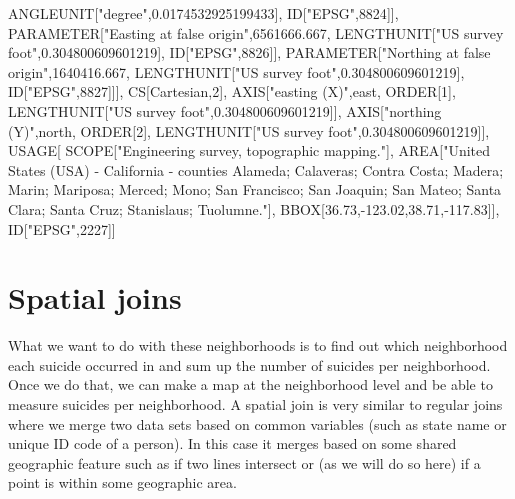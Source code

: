 \documentclass[
]{krantz}
\makeatletter
\newenvironment{Shaded}{\begin{snugshade}}{\end{snugshade}}
\newcommand{\DecValTok}[1]{\textcolor[rgb]{0.06,0.06,0.06}{#1}}
\newcommand{\FloatTok}[1]{\textcolor[rgb]{0.06,0.06,0.06}{#1}}
\newcommand{\NormalTok}[1]{#1}
\newcommand{\SpecialCharTok}[1]{\textcolor[rgb]{0,0,0}{#1}}
\newcommand{\StringTok}[1]{\textcolor[rgb]{0.5,0.5,0.5}{#1}}
\newenvironment{kframe}{%
\medskip{}
\setlength{\fboxsep}{.8em}
 \def\at@end@of@kframe{}%
 \ifinner\ifhmode%
  \def\at@end@of@kframe{\end{minipage}}%
  \begin{minipage}{\columnwidth}%
 \fi\fi%
 \def\FrameCommand##1{\hskip\@totalleftmargin \hskip-\fboxsep
 \colorbox{shadecolor}{##1}\hskip-\fboxsep
     \hskip-\linewidth \hskip-\@totalleftmargin \hskip\columnwidth}%
 \MakeFramed {\advance\hsize-\width
   \@totalleftmargin\z@ \linewidth\hsize
   \@setminipage}}%
 {\par\unskip\endMakeFramed%
 \at@end@of@kframe}
\renewenvironment{Shaded}{\begin{kframe}}{\end{kframe}}
\makeatother
\begin{document}
\begin{Shaded}
\begin{Highlighting}[]
\NormalTok{            ANGLEUNIT[}\StringTok{"degree"}\NormalTok{,}\FloatTok{0.0174532925199433}\NormalTok{],}
\NormalTok{            ID[}\StringTok{"EPSG"}\NormalTok{,}\DecValTok{8824}\NormalTok{]],}
\NormalTok{        PARAMETER[}\StringTok{"Easting at false origin"}\NormalTok{,}\FloatTok{6561666.667}\NormalTok{,}
\NormalTok{            LENGTHUNIT[}\StringTok{"US survey foot"}\NormalTok{,}\FloatTok{0.304800609601219}\NormalTok{],}
\NormalTok{            ID[}\StringTok{"EPSG"}\NormalTok{,}\DecValTok{8826}\NormalTok{]],}
\NormalTok{        PARAMETER[}\StringTok{"Northing at false origin"}\NormalTok{,}\FloatTok{1640416.667}\NormalTok{,}
\NormalTok{            LENGTHUNIT[}\StringTok{"US survey foot"}\NormalTok{,}\FloatTok{0.304800609601219}\NormalTok{],}
\NormalTok{            ID[}\StringTok{"EPSG"}\NormalTok{,}\DecValTok{8827}\NormalTok{]]],}
\NormalTok{    CS[Cartesian,}\DecValTok{2}\NormalTok{],}
\NormalTok{        AXIS[}\StringTok{"easting (X)"}\NormalTok{,east,}
\NormalTok{            ORDER[}\DecValTok{1}\NormalTok{],}
\NormalTok{            LENGTHUNIT[}\StringTok{"US survey foot"}\NormalTok{,}\FloatTok{0.304800609601219}\NormalTok{]],}
\NormalTok{        AXIS[}\StringTok{"northing (Y)"}\NormalTok{,north,}
\NormalTok{            ORDER[}\DecValTok{2}\NormalTok{],}
\NormalTok{            LENGTHUNIT[}\StringTok{"US survey foot"}\NormalTok{,}\FloatTok{0.304800609601219}\NormalTok{]],}
\NormalTok{    USAGE[}
\NormalTok{        SCOPE[}\StringTok{"Engineering survey, topographic mapping."}\NormalTok{],}
\NormalTok{        AREA[}\StringTok{"United States (USA) {-} California {-} counties Alameda; Calaveras; Contra Costa; Madera; Marin; Mariposa; Merced; Mono; San Francisco; San Joaquin; San Mateo; Santa Clara; Santa Cruz; Stanislaus; Tuolumne."}\NormalTok{],}
\NormalTok{        BBOX[}\FloatTok{36.73}\NormalTok{,}\SpecialCharTok{{-}}\FloatTok{123.02}\NormalTok{,}\FloatTok{38.71}\NormalTok{,}\SpecialCharTok{{-}}\FloatTok{117.83}\NormalTok{]],}
\NormalTok{    ID[}\StringTok{"EPSG"}\NormalTok{,}\DecValTok{2227}\NormalTok{]]}
\end{Highlighting}
\end{Shaded}

\hypertarget{spatial-joins}{%
\section{Spatial joins}\label{spatial-joins}}

What we want to do with these neighborhoods is to find out which neighborhood each suicide occurred in and sum up the number of suicides per neighborhood. Once we do that, we can make a map at the neighborhood level and be able to measure suicides per neighborhood. A spatial join is very similar to regular joins where we merge two data sets based on common variables (such as state name or unique ID code of a person). In this case it merges based on some shared geographic feature such as if two lines intersect or (as we will do so here) if a point is within some geographic area.
\end{document}
